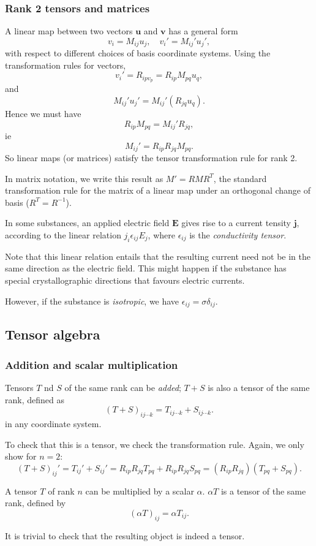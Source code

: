 \documentclass[a4paper]{article}
\begin{document}
\subsubsection{Rank 2 tensors and matrices}
A linear map between two vectors $\mathbf{u}$ and $\mathbf{v}$ has a general form
\[
  v_i = M_{ij}u_j, \quad v_i' = M_{ij}' u_j',
\]
with respect to different choices of basis coordinate systems. Using the transformation rules for vectors,
\[
  v_i' = R_{ip v_p} = R_{ip}M_{pq} u_q,
\]
and
\[
  M_{ij}'u_j' = M_{ij}' (R_{jq} u_q).
\]
Hence we must have
\[
  R_{ip}M_{pq} = M_{ij}'R_{jq},
\]
ie
\[
  M_{ij}' = R_{ip}R_{jq}M_{pq}.
\]
So linear maps (or matrices) satisfy the tensor transformation rule for rank 2.

In matrix notation, we write this result as $M' = RMR^T$, the standard transformation rule for the matrix of a linear map under an orthogonal change of basis ($R^T = R^{-1}$).

\begin{eg}
  In some substances, an applied electric field $\mathbf{E}$ gives rise to a current tensity $\mathbf{j}$, according to the linear relation $j_i \epsilon_{ij} E_j$, where $\epsilon_{ij}$ is the \emph{conductivity tensor}.

  Note that this linear relation entails that the resulting current need not be in the same direction as the electric field. This might happen if the substance has special crystallographic directions that favours electric currents.

  However, if the substance is \emph{isotropic}, we have $\epsilon_{ij} = \sigma\delta_{ij}$.
\end{eg}

\subsection{Tensor algebra}
\subsubsection{Addition and scalar multiplication}
\begin{defi}
  Tensors $T$ nd $S$ of the same rank can be \emph{added}; $T + S$ is also a tensor of the same rank, defined as
  \[
    (T + S)_{ij\cdots k} = T_{ij \cdots k} + S_{ij\cdots k}.
  \]
  in any coordinate system.
\end{defi}
To check that this is a tensor, we check the transformation rule. Again, we only show for $n = 2$:
\[
  (T + S)_{ij}' = T_{ij}' + S_{ij}' = R_{ip}R_{jq}T_{pq} + R_{ip}R_{jq}S_{pq} = (R_{ip}R_{jq})(T_{pq} + S_{pq}).
\]
\begin{defi}
  A tensor $T$ of rank $n$ can be multiplied by a scalar $\alpha$. $\alpha T$ is a tensor of the same rank, defined by
  \[
    (\alpha T)_{ij} = \alpha T_{ij}.
  \]
\end{defi}
It is trivial to check that the resulting object is indeed a tensor.
\end{document}

